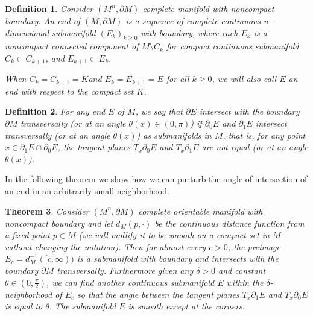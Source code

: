 \documentclass[12pt]{amsart}
\newcommand{\p}{\partial}
\newtheorem{theorem}{Theorem}[section]
\newtheorem{definition}[theorem]{Definition}
\numberwithin{equation}{section}
\begin{document}
	\begin{definition}
		Consider $(M^n,\partial M)$ complete manifold with noncompact boundary. An end of $(M,\partial M)$ is a sequence of complete continuous n-dimensional submanifold $(E_k)_{k\geq 0}$ with boundary, where each $E_k$ is a noncompact connected component of $M\setminus C_k$ for compact continuous submanifold $C_k \subset C_{k+1}$, and $E_{k+1} \subset E_k$. 

		When $C_k=C_{k+1}=K$and $E_k=E_{k+1}=E$ for all $k \geq 0$, we will also call $E$ an end with respect to the compact set $K$.  
	\end{definition}
	

	\begin{definition}
		For any end $E$ of $M$, we  say that $\partial E $ intersect with the boundary $\partial M$ transversally (or at an angle $\theta(x) \in (0,\pi) $) if $\partial_0 E$ and $\partial_1 E$ intersect transversally (or at an angle $\theta(x) $) as submanifolds in $M$, that is, for any point $x \in \p_1 E \cap \p_0 E$, the tangent planes $T_x\p_0 E$ and $T_x\p_1 E$ are not equal (or at an angle $\theta(x)$).
	\end{definition}

	In the following theorem we show how we can purturb the angle of intersection of an end in an arbitrarily small neighborhood.

	\begin{theorem}\label{IntersectionAngle}
		Consider $(M^n,\partial M)$ complete orientable manifold with noncompact boundary and let $d_M(p,\cdot)$ be the continuous distance function from a fixed point $p\in M$ (we will mollify it to be smooth on a compact set in $M$ without changing the notation). Then for almost every $c>0$, the preimage $E_c=d^{-1}_M([c,\infty))$ is a submanifold with boundary and intersects with the boundary $\partial M$ transversally. Furthermore given any $\delta>0$ and constant $\theta \in (0,\frac{\pi}{2})$, we can find another continuous submanifold $E$ within the $\delta$-neighborhood of $E_c$ so that the angle between the tangent planes $T_x \p_1 E$ and $T_x \p_0 E$ is equal to $\theta.$ The submanifold $E$ is smooth except at the corners.
	\end{theorem}
\end{document}
